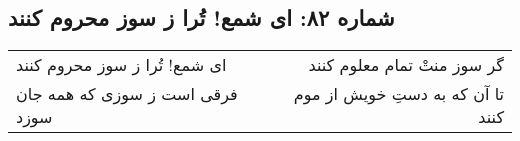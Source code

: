 \begin{center}
\section*{شماره ۸۲: ای شمع! تُرا ز سوز محروم کنند}
\label{sec:082}
\begin{longtable}{l p{0.5cm} r}
ای شمع! تُرا ز سوز محروم کنند
&&
گر سوز منتْ تمام معلوم کنند
\\
فرقی است ز سوزی که همه جان سوزد
&&
تا آن که به دستِ خویش از موم کنند
\\
\end{longtable}
\end{center}
